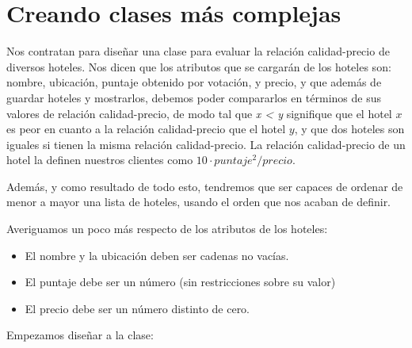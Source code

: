 \section{Creando clases más complejas}

Nos contratan para diseñar una clase para evaluar la relación calidad-precio de
diversos hoteles.  Nos dicen que los atributos que se cargarán de los hoteles
son: nombre, ubicación, puntaje obtenido por votación, y precio, y que además
de guardar hoteles y mostrarlos, debemos poder compararlos en términos de
sus valores de relación calidad-precio, de modo tal que {\it x < y} signifique
que el hotel $x$ es peor en cuanto a la relación calidad-precio que el hotel
$y$, y que dos hoteles son iguales si tienen la misma relación calidad-precio.
La relación calidad-precio de un hotel la definen nuestros clientes como
$10 \cdot puntaje^2 / precio$.

Además, y como resultado de todo esto, tendremos que ser capaces
de ordenar de menor a mayor una lista de hoteles, usando el orden que nos
acaban de definir.

Averiguamos un poco más respecto de los atributos de los hoteles:

\begin{itemize}
\item El nombre y la ubicación deben ser cadenas no vacías.
\item El puntaje debe ser un número (sin restricciones sobre su valor)
\item El precio debe ser un número distinto de cero.
\end{itemize}

Empezamos diseñar a la clase:

